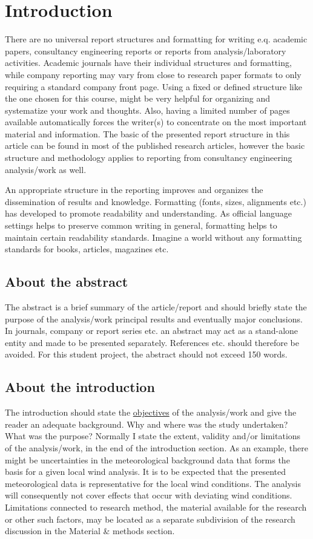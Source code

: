 \documentclass[a4paper,12pt]{extarticle}
\begin{document}
\section{Introduction}
There are no universal report structures and formatting for writing e.q. academic papers, consultancy engineering reports or reports from analysis/laboratory activities. Academic journals have their individual structures and formatting, while company reporting may vary from close to research paper formats to only requiring a standard company front page. Using a fixed or defined structure like the one chosen for this course, might be very helpful for organizing and systematize your work and thoughts. Also, having a limited number of pages available automatically forces the writer(s) to concentrate on the most important material and information. The basic of the presented report structure in this article can be found in most of the published research articles, however the basic structure and methodology applies to reporting from consultancy engineering analysis/work as well.

An appropriate structure in the reporting improves and organizes the dissemination of results and knowledge. Formatting (fonts, sizes, alignments etc.) has developed to promote readability and understanding. As official language settings helps to preserve common writing in general, formatting helps to maintain certain readability standards. Imagine a world without any formatting standards for books, articles, magazines etc.

\subsection{About the abstract}
The abstract is a brief summary of the article/report and should briefly state the purpose of the analysis/work principal results and eventually major conclusions. In journals, company or report series etc. an abstract may act as a stand-alone entity and made to be presented separately. References etc. should therefore be avoided. For this student project, the abstract should not exceed 150 words.

\subsection{About the introduction}
The introduction should state the \ul{objectives} of the analysis/work and give the reader an adequate background. Why and where was the study undertaken? What was the purpose? Normally I state the extent, validity and/or limitations of the analysis/work, in the end of the introduction section. As an example, there might be uncertainties in the meteorological background data that forms the basis for a given local wind analysis. It is to be expected that the presented meteorological data is representative for the local wind conditions. The analysis will consequently not cover effects that occur with deviating wind conditions. Limitations connected to research method, the material available for the research or other such factors, may be located as a separate subdivision of the research discussion in the Material \& methods section.
\end{document}
